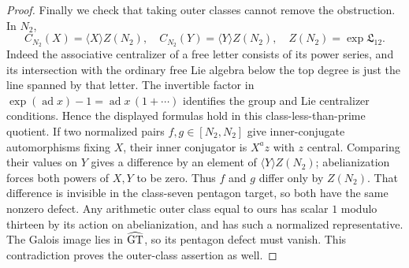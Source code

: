 \begin{proof}
Finally we check that taking outer classes cannot remove the
obstruction.  In $N_2$,
\[
 C_{N_2}(X)=\langle X\rangle Z(N_2),\quad
 C_{N_2}(Y)=\langle Y\rangle Z(N_2),\quad
 Z(N_2)=\exp\mathfrak L_{12}.
\]
Indeed the associative centralizer of a free letter consists of its
power series, and its intersection with the ordinary free Lie algebra
below the top degree is just the line spanned by that letter.
The invertible factor in $\exp(\operatorname{ad}x)-1
=\operatorname{ad}x\,(1+\cdots)$ identifies the group and Lie
centralizer conditions.  Hence the displayed formulas hold in this
class-less-than-prime quotient.
If two normalized pairs $f,g\in[N_2,N_2]$ give inner-conjugate
automorphisms fixing $X$, their inner conjugator is $X^a z$ with
$z$ central.  Comparing their values on $Y$ gives a difference by
an element of $\langle Y\rangle Z(N_2)$; abelianization forces both
powers of $X,Y$ to be zero.  Thus $f$ and $g$ differ only by
$Z(N_2)$.  That difference is invisible in the class-seven pentagon
target, so both have the same nonzero defect.
Any arithmetic outer class equal to ours has scalar $1$ modulo
thirteen by its action on abelianization, and has such a normalized
representative.  The Galois image lies in $\widehat{\mathrm{GT}}$, so its pentagon
defect must vanish.  This contradiction proves the outer-class
assertion as well.
\end{proof}
